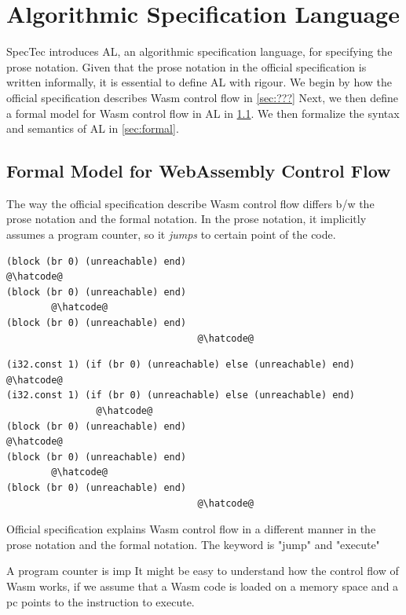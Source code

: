\chapter{Algorithmic Specification Language}
\label{ch:al}
\noindent


SpecTec introduces AL, an algorithmic specification language, for specifying
the prose notation.
Given that the prose notation in the official specification is written
informally, it is essential to define AL with rigour.
We begin by how the official specification describes Wasm control flow in
\cref{sec:???}
Next, we then define a formal model for Wasm control flow in AL in
\cref{sec:model}.
We then formalize the syntax and semantics of AL in \cref{sec:formal}.


\section{Formal Model for WebAssembly Control Flow}
\label{sec:model}

The way the official specification describe Wasm control flow differs b/w the
prose notation and the formal notation.
In the prose notation, it implicitly assumes a program counter, so it
\textit{jumps} to certain point of the code.
\begin{lstlisting}[style=wasm]
(block (br 0) (unreachable) end)
@\hatcode@
(block (br 0) (unreachable) end)
        @\hatcode@
(block (br 0) (unreachable) end)
                                  @\hatcode@
\end{lstlisting}


\begin{lstlisting}[style=wasm]
(i32.const 1) (if (br 0) (unreachable) else (unreachable) end)
@\hatcode@
(i32.const 1) (if (br 0) (unreachable) else (unreachable) end)
                @\hatcode@
(block (br 0) (unreachable) end)
@\hatcode@
(block (br 0) (unreachable) end)
        @\hatcode@
(block (br 0) (unreachable) end)
                                  @\hatcode@
\end{lstlisting}
Official specification explains Wasm control flow in a different manner in the prose notation and the formal notation.
The keyword is "jump" and "execute"




\newcommand{\officialp}{official prose}
\newcommand{\spectecp}{SpecTec prose}


A program counter is imp
It might be easy to understand how the control flow of Wasm works, if we assume
that a Wasm code is loaded on a memory space and a pc points to the instruction
to execute.





